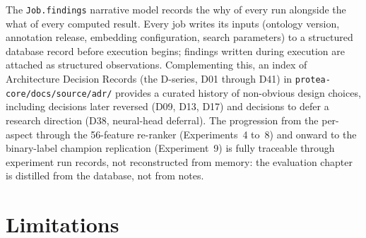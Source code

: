 The \texttt{Job.findings} narrative model records the why of every run
alongside the what of every computed result. Every job writes its inputs
(ontology version, annotation release, embedding configuration, search
parameters) to a structured database record before execution begins; findings
written during execution are attached as structured observations. Complementing
this, an index of Architecture Decision Records (the D-series, D01 through
D41) in \texttt{protea-core/docs/source/adr/} provides a curated history of
non-obvious design choices, including decisions later reversed (D09, D13,
D17) and decisions to defer a research direction (D38, neural-head
deferral). The progression from the per-aspect through the 56-feature re-ranker
(Experiments~4 to~8) and onward to the binary-label champion replication
(Experiment~9) is fully traceable through experiment run records, not
reconstructed from memory: the evaluation chapter is distilled from the database,
not from notes.

\section{Limitations}
\label{sec:conclusion-limitations}

